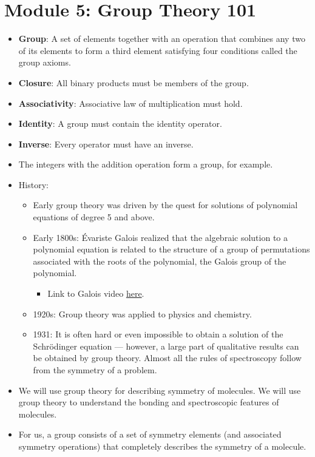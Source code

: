 \documentclass[../notes.tex]{subfiles}
\begin{document}
\section{Module 5: Group Theory 101}
\begin{itemize}
    \item {}\textbf{Group}: A set of elements together with an operation that combines any two of its elements to form a third element satisfying four conditions called the group axioms.
    \item \textbf{Closure}: All binary products must be members of the group.
    \item \textbf{Associativity}: Associative law of multiplication must hold.
    \item \textbf{Identity}: A group must contain the identity operator.
    \item \textbf{Inverse}: Every operator must have an inverse.
    \item The integers with the addition operation form a group, for example.
    \item History:
    \begin{itemize}
        \item Early group theory was driven by the quest for solutions of polynomial equations of degree 5 and above.
        \item Early 1800s: \'{E}variste Galois realized that the algebraic solution to a polynomial equation is related to the structure of a group of permutations associated with the roots of the polynomial, the Galois group of the polynomial.
        \begin{itemize}
            \item Link to Galois video \href{https://www.youtube.com/watch?v=Ct2fyigNgPY}{here}.
        \end{itemize}
        \item 1920s: Group theory was applied to physics and chemistry.
        \item 1931: It is often hard or even impossible to obtain a solution of the Schr\"{o}dinger equation --- however, a large part of qualitative results can be obtained by group theory. Almost all the rules of spectroscopy follow from the symmetry of a problem.
    \end{itemize}
    \item We will use group theory for describing symmetry of molecules. We will use group theory to understand the bonding and spectroscopic features of molecules.
    \item For us, a group consists of a set of symmetry elements (and associated symmetry operations) that completely describes the symmetry of a molecule.

\end{itemize}
\end{document}
